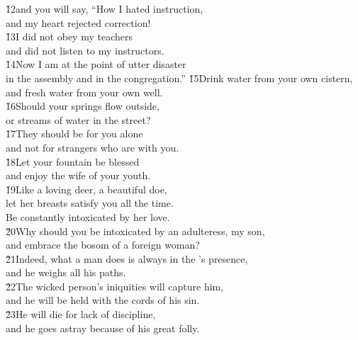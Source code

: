 \begin{poetry}
\poeml \v{12}and you will say, ``How I hated instruction, \\
\poemll    and my heart rejected correction! \\
\poeml \v{13}I did not obey my teachers \\
\poemll    and did not listen to my instructors. \\
\poeml \v{14}Now I am at the point of utter disaster \\
\poemll    in the assembly and in the congregation.''
\poeml \v{15}Drink water from your own cistern, \\
\poemll    and fresh water from your own well. \\
\poeml \v{16}Should your springs flow outside, \\
\poemll    or streams of water in the street? \\
\poeml \v{17}They should be for you alone \\
\poemll    and not for strangers who are with you. \\
\poeml \v{18}Let your fountain be blessed \\
\poemll    and enjoy the wife of your youth. \\
\poeml \v{19}Like a loving deer, a beautiful doe, \\
\poemll    let her breasts satisfy you all the time. \\
\poemlll       Be constantly intoxicated by her love. \\
\poeml \v{20}Why should you be intoxicated by an adulteress, my son, \\
\poemll    and embrace the bosom of a foreign woman? \\
\poeml \v{21}Indeed, what a man does is always in the 's presence, \\
\poemll    and he weighs all his paths. \\
\poeml \v{22}The wicked person's iniquities will capture him, \\
\poemll    and he will be held with the cords of his sin. \\
\poeml \v{23}He will die for lack of discipline, \\
\poemll    and he goes astray because of his great folly.
\end{poetry}

